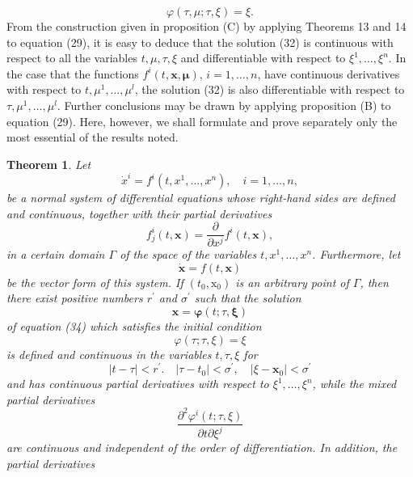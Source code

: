 \documentclass[10pt,a5paper]{book}
\makeatletter
\theoremstyle{plain}
\newtheorem{theorem}{Theorem}
\theoremstyle{definition}
\theoremstyle{remark}
\renewenvironment{proof}[1][\proofname]{\par
  \pushQED{\qed}%
  \normalfont\topsep6\p@\@plus6\p@\relax
  \trivlist
  \item\relax{\itshape #1\@addpunct{.}}\hspace\labelsep\ignorespaces
}{\popQED\endtrivlist\@endpefalse}
\makeatother
\begin{document}
\begin{proof}
\[
\varphi(\tau, \mu ; \tau, \xi)=\xi .
\]
From the construction given in proposition (C) by applying Theorems 13 and 14 to equation (29), it is easy to deduce that the solution (32) is continuous with respect to all the variables $t, \mu, \tau, \xi$ and differentiable with respect to $\xi^{1}, \ldots, \xi^{n}$. In the case that the functions $f^{i}(t, \mathbf{x}, \boldsymbol{\mu})$, $i=1, \ldots, n$, have continuous derivatives with respect to $t, \mu^{1}, \ldots, \mu^{l}$, the solution (32) is also differentiable with respect to $\tau, \mu^{1}, \ldots, \mu^{l}$. Further conclusions may be drawn by applying proposition (B) to equation (29). Here, however, we shall formulate and prove separately only the most essential of the results noted.
\end{proof}

\begin{theorem}
Let
\begin{equation*}
\dot{x}^{i}=f^{i}\left(t, x^{1}, \ldots, x^{n}\right), \quad i=1, \ldots, n, \tag{33}
\end{equation*}
be a normal system of differential equations whose right-hand sides are defined and continuous, together with their partial derivatives
\[
f_{j}^{i}(t, \mathbf{x})=\frac{\partial}{\partial x^{j}} f^{i}(t, \mathbf{x}),
\]
in a certain domain $\Gamma$ of the space of the variables $t, x^{1}, \ldots, x^{n}$. Furthermore, let
\begin{equation*}
\dot{\mathbf{x}}=f(t, \mathbf{x}) \tag{34}
\end{equation*}
be the vector form of this system. If $\left(t_{0}, \mathrm{x}_{0}\right)$ is an arbitrary point of $\Gamma$, then there exist positive numbers $r^{\prime}$ and $\sigma^{\prime}$ such that the solution
\begin{equation*}
\mathbf{x}=\boldsymbol{\varphi}(t ; \tau, \boldsymbol{\xi}) \tag{35}
\end{equation*}
of equation (34) which satisfies the initial condition
\[
\varphi(\tau ; \tau, \xi)=\xi
\]
is defined and continuous in the variables $t, \tau, \xi$ for
\begin{equation*}
|t-\tau|<r^{\prime} . \quad\left|\tau-t_{0}\right|<\sigma^{\prime}, \quad\left|\xi-\mathbf{x}_{0}\right|<\sigma^{\prime} \tag{36}
\end{equation*}
and has continuous partial derivatives with respect to $\xi^{1}, \ldots, \xi^{n}$, while the mixed partial derivatives
\[
\frac{\partial^{2} \varphi^{i}(t ; \tau, \xi)}{\partial t \partial \xi^{j}}
\]
are continuous and independent of the order of differentiation. In addition, the partial derivatives

\end{theorem}
\end{document}

